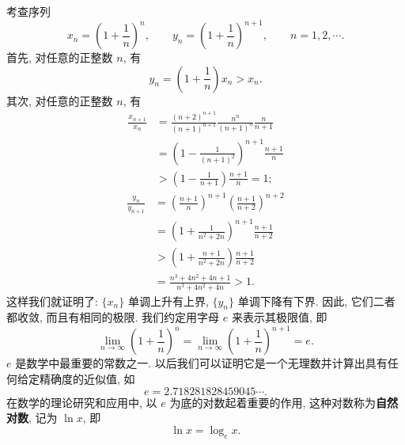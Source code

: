 \documentclass[UTF8,12pt,a4paper,fontset=fandol]{ctexart}
\begin{document}
考查序列
\[
  x_n=\left(1+\frac1n\right)^n,\qquad
  y_n=\left(1+\frac1n\right)^{n+1},\qquad n=1,2,\cdots.
\]
首先, 对任意的正整数 $n$, 有
\[
  y_n=\left(1+\frac1n\right)x_n>x_n.
\]
其次, 对任意的正整数 $n$, 有
\[
\begin{aligned}
  \frac{x_{n+1}}{x_n}
  &=
  \frac{(n+2)^{n+1}}{(n+1)^{n+1}}\frac{n^n}{(n+1)^n}\frac n{n+1}\\
  &=
  \left(1-\frac1{(n+1)^2}\right)^{n+1}\frac{n+1}{n}\\
  &>
  \left(1-\frac1{n+1}\right)\frac{n+1}{n}
  =
  1;
\end{aligned}
\]
\[
\begin{aligned}
  \frac{y_n}{y_{n+1}}
  &=
  \left(\frac{n+1}{n}\right)^{n+1}
  \left(\frac{n+1}{n+2}\right)^{n+2}\\
  &=
  \left(1+\frac1{n^2+2n}\right)^{n+1}\frac{n+1}{n+2}\\
  &>
  \left(1+\frac{n+1}{n^2+2n}\right)\frac{n+1}{n+2}\\
  &=
  \frac{n^3+4n^2+4n+1}{n^3+4n^2+4n}>1.
\end{aligned}
\]
这样我们就证明了: $\{x_n\}$ 单调上升有上界, $\{y_n\}$ 单调下降有下界. 因此, 它们二者都收敛, 而且有相同的极限. 我们约定用字母 $e$ 来表示其极限值, 即
\[
  \lim_{n\to\infty}\left(1+\frac1n\right)^n
  =
  \lim_{n\to\infty}\left(1+\frac1n\right)^{n+1}
  =
  e.
\]
$e$ 是数学中最重要的常数之一. 以后我们可以证明它是一个无理数并计算出具有任何给定精确度的近似值, 如
\[
  e=2.718281828459045\cdots.
\]
在数学的理论研究和应用中, 以 $e$ 为底的对数起着重要的作用, 这种对数称为\textbf{自然对数}, 记为 $\ln x$, 即
\[
  \ln x=\log_e x.
\]
\end{document}
